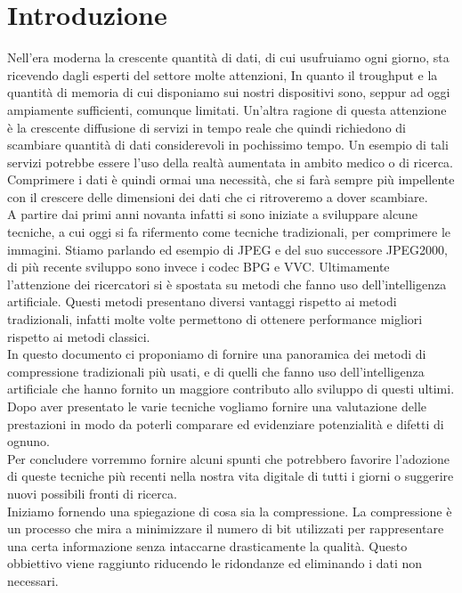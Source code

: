 \chapter*{Introduzione}
Nell’era moderna la crescente quantità di dati, di cui usufruiamo ogni giorno, sta ricevendo dagli esperti del settore molte attenzioni, In quanto il troughput e la quantità di memoria di cui disponiamo sui nostri dispositivi sono, seppur ad oggi ampiamente sufficienti, comunque limitati. Un’altra ragione di questa attenzione è la crescente diffusione di servizi in tempo reale che quindi richiedono di scambiare quantità di dati considerevoli in pochissimo tempo. Un esempio di tali servizi potrebbe essere l’uso della realtà aumentata in ambito medico o di ricerca. Comprimere i dati è quindi ormai una necessità, che si farà sempre più impellente con il crescere delle dimensioni dei dati che ci ritroveremo a dover scambiare.\\
A partire dai primi anni novanta infatti si sono iniziate a sviluppare alcune tecniche, a cui oggi si fa rifermento come tecniche tradizionali, per comprimere le immagini. Stiamo parlando ed esempio di JPEG e del suo successore JPEG2000, di più recente sviluppo sono invece i codec BPG e VVC.
Ultimamente l’attenzione dei ricercatori si è spostata su metodi che fanno uso dell'intelligenza artificiale. Questi metodi presentano diversi vantaggi rispetto ai metodi tradizionali, infatti molte volte permettono di ottenere performance migliori rispetto ai metodi classici.\\
In questo documento ci proponiamo di fornire una panoramica dei metodi di compressione tradizionali più usati, e di quelli che fanno uso dell'intelligenza artificiale che hanno fornito un maggiore contributo allo sviluppo di questi ultimi. Dopo aver presentato le varie tecniche vogliamo fornire una valutazione delle prestazioni in modo da poterli comparare ed evidenziare potenzialità e difetti di ognuno.\\
Per concludere vorremmo fornire alcuni spunti che potrebbero favorire l’adozione di queste tecniche più recenti nella nostra vita digitale di tutti i giorni o suggerire nuovi possibili fronti di ricerca.\\
Iniziamo fornendo una spiegazione di cosa sia la compressione. La compressione è un processo che mira a minimizzare il numero di bit utilizzati per rappresentare una certa informazione senza intaccarne drasticamente la qualità. Questo obbiettivo viene raggiunto riducendo le ridondanze ed eliminando i dati non necessari.
